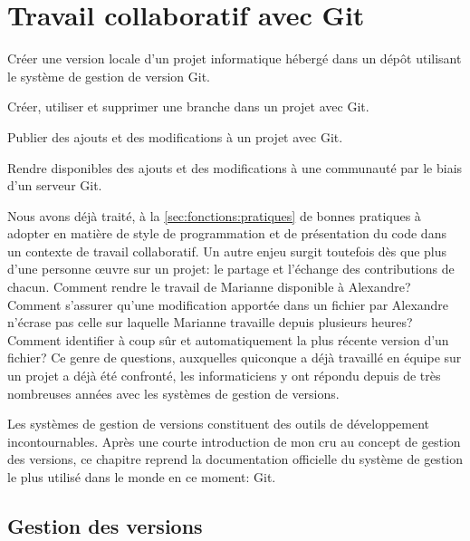 
\chapter{Travail collaboratif avec Git}
\label{chap:git}

\begin{objectifs}
\item Créer une version locale d'un projet informatique hébergé dans
  un dépôt utilisant le système de gestion de version Git.
\item Créer, utiliser et supprimer une branche dans un projet avec
  Git.
\item Publier des ajouts et des modifications à un projet avec Git.
\item Rendre disponibles des ajouts et des modifications à une
  communauté par le biais d'un serveur Git.
\end{objectifs}

Nous avons déjà traité, à la \autoref{sec:fonctions:pratiques} de
bonnes pratiques à adopter en matière de style de programmation et de
présentation du code dans un contexte de travail collaboratif. Un
autre enjeu surgit toutefois dès que plus d'une personne œuvre sur un
projet: le partage et l'échange des contributions de chacun. Comment
rendre le travail de Marianne disponible à Alexandre? Comment
s'assurer qu'une modification apportée dans un fichier par Alexandre
n'écrase pas celle sur laquelle Marianne travaille depuis plusieurs
heures? Comment identifier à coup sûr et automatiquement la plus
récente version d'un fichier? Ce genre de questions, auxquelles
quiconque a déjà travaillé en équipe sur un projet a déjà été
confronté, les informaticiens y ont répondu depuis de très nombreuses
années avec les systèmes de gestion de versions.

Les systèmes de gestion de versions constituent des outils de
développement incontournables. Après une courte introduction de mon
cru au concept de gestion des versions, ce chapitre reprend la
documentation officielle du système de gestion le plus utilisé dans le
monde en ce moment: Git.


\section{Gestion des versions}
\label{sec:git:vc}

